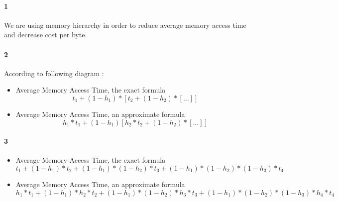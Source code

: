 \documentclass[11pt]{article}
\begin{document}
\paragraph{1}
We are using memory hierarchy in order to reduce average memory access time and
decrease cost per byte.
\paragraph{2}
According to following diagram :


\begin{itemize}
\item
	Average Memory Access Time, the exact formula
	\begin{equation}
		\label{eq:AMAT-e}
		t_1 + (1 - h_1) * [t_2 + (1 - h_2) * [\ldots]]
	\end{equation}	
\item
	Average Memory Access Time, an approximate formula
	\begin{equation}
		\label{eq:AMAT-a}
		h_1 * t_1 + (1 - h_1) [h_2 * t_2 + (1 - h_2) * [\ldots]]
	\end{equation}
\end{itemize}
\paragraph{3}
\begin{itemize}
\item
	Average Memory Access Time, the exact formula
	\begin{equation}
		\label{eq:AMAT-e-4}
		t_1 + (1 - h_1) * t_2 + (1 - h_1) * (1 - h_2) * t_3 + (1 - h_1) * (1 - h_2) * (1 - h_3) * t_4
	\end{equation}
\item
	Average Memory Access Time, an approximate formula
	\begin{equation}
		\label{eq:AMAT-a-4}
		h_1 * t_1 + (1 - h_1) * h_2 * t_2 + (1 - h_1) * (1 - h_2) * h_3 * t_3 + (1 - h_1) * (1 - h_2) * (1 - h_3) * h_4 * t_4
	\end{equation}
\end{itemize}
\end{document}
